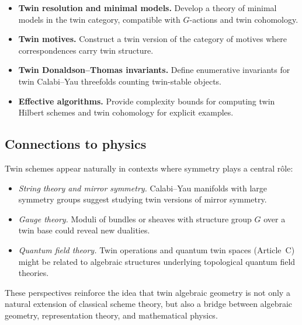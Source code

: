 \documentclass[11pt,a4paper]{article}
\numberwithin{equation}{section}
\begin{document}
	\begin{itemize}
		\item \textbf{Twin resolution and minimal models.}
		Develop a theory of minimal models in the twin category, compatible with $G$-actions and twin cohomology.
		\item \textbf{Twin motives.}
		Construct a twin version of the category of motives where correspondences carry twin structure.
		\item \textbf{Twin Donaldson--Thomas invariants.}
		Define enumerative invariants for twin Calabi--Yau threefolds counting twin-stable objects.
		\item \textbf{Effective algorithms.}
		Provide complexity bounds for computing twin Hilbert schemes and twin cohomology for explicit examples.
	\end{itemize}
	
	\subsection{Connections to physics}
	
	Twin schemes appear naturally in contexts where symmetry plays a central r\^ole:
	\begin{itemize}
		\item \emph{String theory and mirror symmetry.}
		Calabi--Yau manifolds with large symmetry groups suggest studying twin versions of mirror symmetry.
		\item \emph{Gauge theory.}
		Moduli of bundles or sheaves with structure group $G$ over a twin base could reveal new dualities.
		\item \emph{Quantum field theory.}
		Twin operations and quantum twin spaces (Article~C) might be related to algebraic structures 
		underlying topological quantum field theories.
	\end{itemize}
	
	These perspectives reinforce the idea that twin algebraic geometry is not only a natural extension of 
	classical scheme theory, but also a bridge between algebraic geometry, representation theory, and 
	mathematical physics.
	
\end{document}

